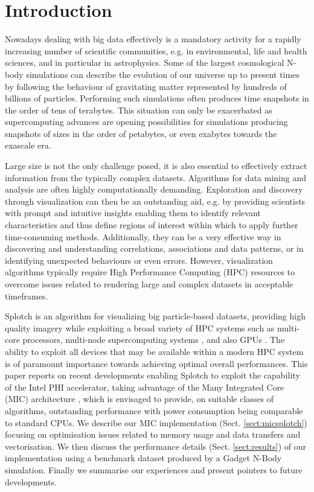 \documentclass[runningheads,a4paper]{llncs}
\begin{document}
\section{Introduction}
\label{sect:introduction}

Nowadays dealing with big data effectively is a mandatory activity for a rapidly increasing number of scientific communities,
e.g. in environmental, life and health sciences, and in particular in astrophysics. Some of the largest cosmological N-body
simulations can describe the evolution of our universe up to present times by following the behaviour of gravitating matter
represented by hundreds of billions of particles. Performing such simulations often produces time snapshots in the order of tens
of terabytes. This situation can only be exacerbated as supercomputing advances are opening possibilities for simulations
producing snapshots of sizes in the order of petabytes, or even exabytes towards the exascale era.

Large size is not the only challenge posed, it is also essential to effectively extract information from the typically complex datasets. 
Algorithms for data mining and analysis are often highly computationally demanding.
Exploration and discovery through visualization can then be an outstanding aid,
e.g. by providing scientists with prompt and intuitive insights enabling them to identify relevant characteristics and thus
define regions of interest within which to apply further time-consuming methods. Additionally, they can be a very effective
way in discovering and understanding correlations, associations and data patterns, or in identifying unexpected behaviours or
even errors. However, visualization algorithms typically require High Performance Computing (HPC) resources to overcome issues
related to rendering large and complex datasets in acceptable timeframes.

Splotch\cite{splotch} is an algorithm for visualizing big particle-based datasets, providing high quality imagery while exploiting
a broad variety of HPC systems such as multi-core processors, multi-node supercomputing systems \cite{splotchmulti}, and
also GPUs \cite{splotchgpu}. The ability to exploit all devices that may be available within a modern HPC system is of paramount
importance towards achieving optimal overall performances. This paper reports on recent developments enabling Splotch to
exploit the capability of the Intel PHI \cite{xeonphi} accelerator, taking advantage of the Many Integrated Core (MIC)
architecture \cite{mic}, which is envisaged to provide, on suitable classes of algorithms, outstanding performance with power
consumption being comparable to standard CPUs. We describe our MIC implementation (Sect. \ref{sect:micsplotch}) focusing on
optimisation issues related to memory usage and data transfers and vectorisation. We then discuss the performance details
(Sect. \ref{sect:results}) of our implementation using a benchmark dataset produced by a Gadget \cite{gadget} N-Body simulation. 
Finally we summarise our experiences and present pointers to future developments.
\end{document}

